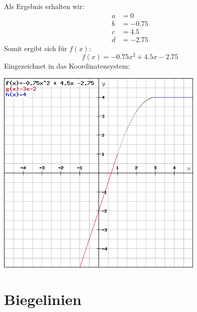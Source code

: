 \documentclass[a4paper,12pt]{article}
\begin{document}
Als Ergebnis erhalten wir:
\begin{equation}
\begin{split}
a & = 0\\
b & = -0.75\\
c & = 4.5\\
d & = -2.75
\end{split}
\end{equation}
Somit ergibt sich für $f(x)$:
$$f(x) = -0.75x^2 + 4.5x - 2.75$$
Eingezeichnet in das Koordinatensystem:
\begin{center}
\includegraphics[width=0.75\textwidth]{image2.png}
\end{center}
\pagebreak
\section{Biegelinien}
\end{document}
